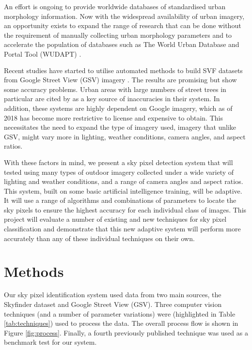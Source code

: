 \documentclass[final,3p,times,authoryear]{elsarticle}
\begin{document}
An effort is ongoing to provide worldwide databases of standardised urban morphology information. Now with the widespread availability of urban imagery, an opportunity exists to expand the range of research that can be done without the requirement of manually collecting urban morphology parameters and to accelerate the population of databases such as The World Urban Database and Portal Tool (WUDAPT) \citep{Mills2015}.

Recent studies have started to utilise automated methods to build SVF datasets from Google Street View (GSV) imagery \citep{Middel2018,Gong2018}. The results are promising but show some accuracy problems. Urban areas with large numbers of street trees in particular are cited by \cite{Gong2018} as a key source of inaccuracies in their system. In addition, these systems are highly dependent on Google imagery, which as of 2018 has become more restrictive to license and expensive to obtain. This necessitates the need to expand the type of imagery used, imagery that unlike GSV, might vary more in lighting, weather conditions, camera angles, and aspect ratios. 

With these factors in mind, we present a sky pixel detection system that will tested using many types of outdoor imagery collected under a wide variety of lighting and weather conditions, and a range of camera angles and aspect ratios. This system, built on some basic artificial intelligence training, will be adaptive. It will use a range of algorithms and combinations of parameters to locate the sky pixels to ensure the highest accuracy for each individual class of images. This project will evaluate a number of existing and new techniques for sky pixel classification and demonstrate that this new adaptive system will perform more accurately than any of these individual techniques on their own.



\section{Methods}\label{sec:Methods}
Our sky pixel identification system used data from two main sources, the Skyfinder dataset and Google Street View (GSV). Three computer vision techniques (and a number of parameter variations) were (highlighted in Table \ref{tab:techniques}) used to process the data. The overall process flow is shown in Figure \ref{fig:process}. Finally, a fourth previously published technique was used as a benchmark test for our system.
\end{document}
